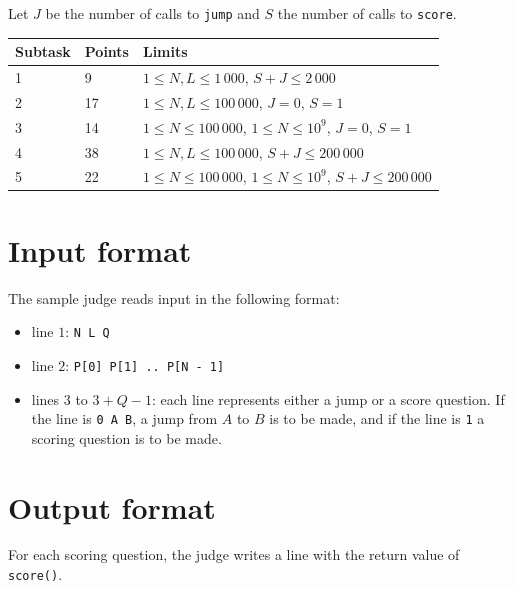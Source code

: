 Let $J$ be the number of calls to \texttt{jump} and $S$ the number of calls to \texttt{score}.

\begin{tabular}{|l|l|l|}
  \hline
  \textbf{Subtask} & \textbf{Points} & \textbf{Limits} \\ \hline
  1 & 9 & $1 \le N, L \le 1\,000$,  $S + J \le 2\,000$ \\ \hline
  2 & 17 & $1 \le N, L \le 100\,000$, $J = 0$, $S = 1$ \\ \hline
  3 & 14 & $1 \le N \le 100\,000$, $1 \le N \le 10^9$, $J = 0$, $S = 1$ \\ \hline
  4 & 38 & $1 \le N, L \le 100\,000$, $S + J \le 200\,000$ \\ \hline
  5 & 22 & $1 \le N \le 100\,000$, $1 \le N \le 10^9$, $S + J \le 200\,000$ \\ \hline
\end{tabular}

\section*{Input format}
The sample judge reads input in the following format:

\begin{itemize}
  \item line $1$: \texttt{N L Q}
  \item line $2$: \texttt{P[0] P[1] .. P[N - 1]}
  \item lines $3$ to $3 + Q - 1$: each line represents either a jump or a score question.
    If the line is \texttt{0 A B}, a jump from $A$ to $B$ is to be made, and if the line is \texttt{1} a scoring question is to be made.
\end{itemize}

\section*{Output format}
For each scoring question, the judge writes a line with the return value of \texttt{score()}.
